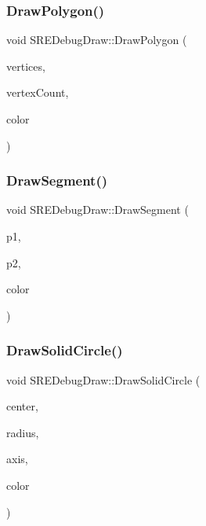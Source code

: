 \subsubsection{\texorpdfstring{Draw\+Polygon()}{DrawPolygon()}}
{\footnotesize\ttfamily void S\+R\+E\+Debug\+Draw\+::\+Draw\+Polygon (\begin{DoxyParamCaption}\item[{const b2\+Vec2 $\ast$}]{vertices,  }\item[{int32}]{vertex\+Count,  }\item[{const b2\+Color \&}]{color }\end{DoxyParamCaption})}

\hypertarget{class_mason_1_1_s_r_e_debug_draw_ae52016e6134930d09f6f8a07308cc9e7}{}\label{class_mason_1_1_s_r_e_debug_draw_ae52016e6134930d09f6f8a07308cc9e7} 
\subsubsection{\texorpdfstring{Draw\+Segment()}{DrawSegment()}}
{\footnotesize\ttfamily void S\+R\+E\+Debug\+Draw\+::\+Draw\+Segment (\begin{DoxyParamCaption}\item[{const b2\+Vec2 \&}]{p1,  }\item[{const b2\+Vec2 \&}]{p2,  }\item[{const b2\+Color \&}]{color }\end{DoxyParamCaption})}

\hypertarget{class_mason_1_1_s_r_e_debug_draw_a9392357bb882d28ca0a86f179901488b}{}\label{class_mason_1_1_s_r_e_debug_draw_a9392357bb882d28ca0a86f179901488b} 
\subsubsection{\texorpdfstring{Draw\+Solid\+Circle()}{DrawSolidCircle()}}
{\footnotesize\ttfamily void S\+R\+E\+Debug\+Draw\+::\+Draw\+Solid\+Circle (\begin{DoxyParamCaption}\item[{const b2\+Vec2 \&}]{center,  }\item[{float32}]{radius,  }\item[{const b2\+Vec2 \&}]{axis,  }\item[{const b2\+Color \&}]{color }\end{DoxyParamCaption})}

